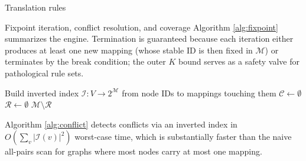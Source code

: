 \documentclass[
  ignorenonframetext,
]{beamer}
\begin{document}
\begin{frame}[fragile]{Translation rules}
\begin{block}{Fixpoint iteration, conflict resolution, and coverage}
Algorithm \ref{alg:fixpoint} summarizes the engine. Termination is
guaranteed because each iteration either produces at least one new
mapping (whose stable ID is then fixed in \(\mathcal{M}\)) or terminates
by the break condition; the outer \(K\) bound serves as a safety valve
for pathological rule sets.

\begin{algorithm}
\caption{Priority-ordered conflict resolution}
\label{alg:conflict}
Build inverted index $\mathcal{I}: V \to 2^{\mathcal{M}}$ from node IDs to mappings touching them\;
$\mathcal{C} \leftarrow \emptyset$ 
$\mathcal{R} \leftarrow \emptyset$ 
\Return $\mathcal{M} \setminus \mathcal{R}$\;
\end{algorithm}

Algorithm \ref{alg:conflict} detects conflicts via an inverted index in
\(O(\sum_v |\mathcal{I}(v)|^2)\) worst-case time, which is substantially
faster than the naive all-pairs scan for graphs where most nodes carry
at most one mapping.
\end{block}
\end{frame}
\end{document}
